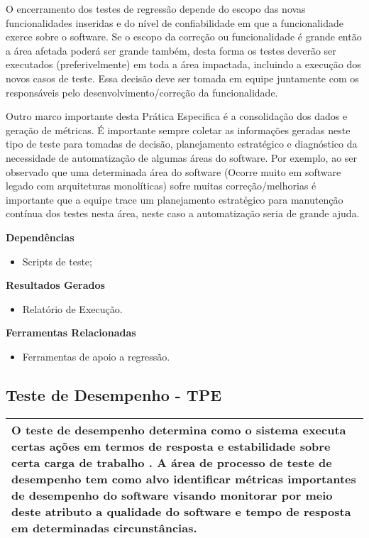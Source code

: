 O encerramento dos testes de regressão depende do escopo das novas funcionalidades inseridas e do nível de confiabilidade em que a funcionalidade exerce sobre o software. Se o escopo da correção ou funcionalidade é grande então a área afetada poderá ser grande também, desta forma os testes deverão ser executados (preferivelmente) em toda a área impactada, incluindo a execução dos novos casos de teste. Essa decisão deve ser tomada em equipe juntamente com os responsáveis pelo desenvolvimento/correção da funcionalidade.

Outro marco importante desta Prática Especifica é a consolidação dos dados e geração de métricas. É importante sempre coletar as informações geradas neste tipo de teste para tomadas de decisão, planejamento estratégico e diagnóstico da necessidade de automatização de algumas áreas do software. Por exemplo, ao ser observado que uma determinada área do software (Ocorre muito em software legado com arquiteturas monolíticas) sofre muitas correção/melhorias é importante que a equipe trace um planejamento estratégico para manutenção contínua dos testes nesta área, neste caso a automatização seria de grande ajuda.


\textbf{Dependências}
\begin{itemize}
    \item Scripts de teste;
\end{itemize}

\textbf{Resultados Gerados}
\begin{itemize}
    \item Relatório de Execução.
\end{itemize}

\textbf{Ferramentas Relacionadas}
\begin{itemize}
    \item Ferramentas de apoio a regressão.
\end{itemize}

\subsection{Teste de Desempenho - TPE}
\label{sec:tpe}

\begin{table}[!ht]
\centering
\begin{tabular}{|p{130mm}|}
\hline
O teste de desempenho determina como o sistema executa certas ações em termos de resposta e estabilidade sobre certa carga de trabalho \cite{Molyneaux2009}. A área de processo de teste de desempenho tem como alvo identificar métricas importantes de desempenho do software visando monitorar por meio deste atributo a qualidade do software e tempo de resposta em determinadas circunstâncias.\\
\hline
\end{tabular}
\end{table}

